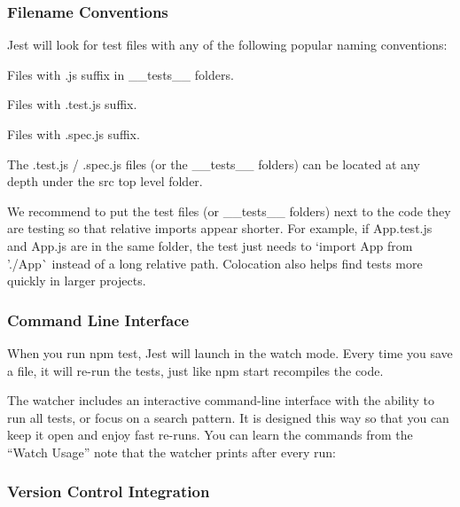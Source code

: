 \subsubsection*{Filename Conventions}

Jest will look for test files with any of the following popular naming conventions\+:


\begin{DoxyItemize}
\item Files with {\ttfamily .js} suffix in {\ttfamily \+\_\+\+\_\+tests\+\_\+\+\_\+} folders.
\item Files with {\ttfamily .test.\+js} suffix.
\item Files with {\ttfamily .spec.\+js} suffix.
\end{DoxyItemize}

The {\ttfamily .test.\+js} / {\ttfamily .spec.\+js} files (or the {\ttfamily \+\_\+\+\_\+tests\+\_\+\+\_\+} folders) can be located at any depth under the {\ttfamily src} top level folder.

We recommend to put the test files (or {\ttfamily \+\_\+\+\_\+tests\+\_\+\+\_\+} folders) next to the code they are testing so that relative imports appear shorter. For example, if {\ttfamily App.\+test.\+js} and {\ttfamily App.\+js} are in the same folder, the test just needs to `import App from './\+App\textquotesingle{}\`{} instead of a long relative path. Colocation also helps find tests more quickly in larger projects.

\subsubsection*{Command Line Interface}

When you run {\ttfamily npm test}, Jest will launch in the watch mode. Every time you save a file, it will re-\/run the tests, just like {\ttfamily npm start} recompiles the code.

The watcher includes an interactive command-\/line interface with the ability to run all tests, or focus on a search pattern. It is designed this way so that you can keep it open and enjoy fast re-\/runs. You can learn the commands from the “\+Watch Usage” note that the watcher prints after every run\+:



\subsubsection*{Version Control Integration}

